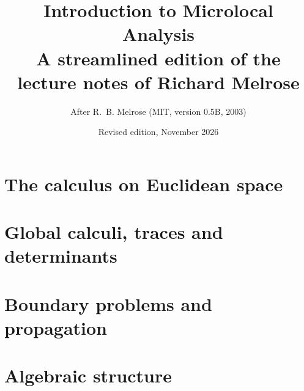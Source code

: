 \documentclass[11pt,openany]{book}
\title{Introduction to Microlocal Analysis\\[1ex]\large A streamlined edition of the lecture notes of Richard Melrose}
\author{After R.~B. Melrose (MIT, version 0.5B, 2003)}
\date{Revised edition, November 2026}
\begin{document}
\frontmatter
\maketitle
\tableofcontents


\mainmatter
\part{The calculus on Euclidean space}





\part{Global calculi, traces and determinants}



\part{Boundary problems and propagation}




\part{Algebraic structure}


\appendix


\backmatter

\end{document}
